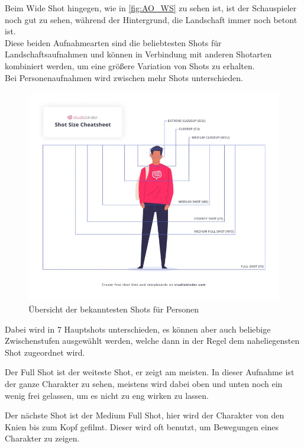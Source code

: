 Beim Wide Shot hingegen, wie in \autoref{fig:AO_WS} zu sehen ist, ist der Schauspieler noch gut zu sehen, während der Hintergrund, die Landschaft immer noch betont ist.\\
Diese beiden Aufnahmearten sind die beliebtesten Shots für Landschaftsaufnahmen und können in Verbindung mit anderen Shotarten kombiniert werden, um eine größere Variation von Shots zu erhalten.\\

Bei Personenaufnahmen wird zwischen mehr Shots unterschieden. 

\begin{figure}[h]
    \centering
    \includegraphics[width=1\textwidth]{img/AO_ShotOverview.jpg}
    \caption[Imagefilm: Shots Übersicht]{Übersicht der bekanntesten Shots für Personen}
    \label{fig:AO_WS}
\end{figure}

Dabei wird in 7 Hauptshots unterschieden, es können aber auch beliebige Zwischenstufen ausgewählt werden, welche dann in der Regel dem naheliegensten Shot zugeordnet wird. 

Der Full Shot ist der weiteste Shot, er zeigt am meisten. In dieser Aufnahme ist der ganze Charakter zu sehen, meistens wird dabei oben und unten noch ein wenig frei gelassen, um es nicht zu eng wirken zu lassen. 

Der nächste Shot ist der Medium Full Shot, hier wird der Charakter von den Knien bis zum Kopf gefilmt. Dieser wird oft benutzt, um Bewegungen eines Charakter zu zeigen.

